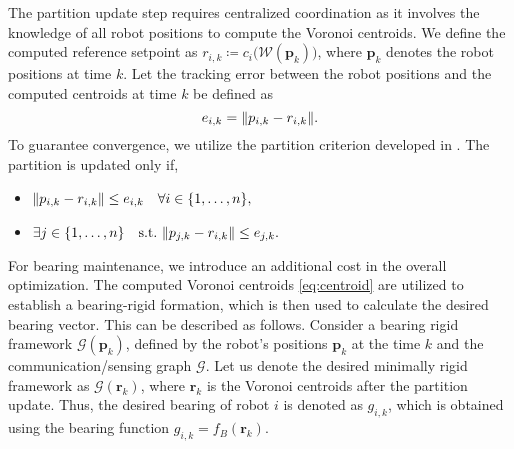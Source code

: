 The partition update step requires centralized coordination as it involves the knowledge of all robot positions to compute the Voronoi centroids. %
We define the computed reference setpoint as $r_{i,k} \coloneq c_i \big( \mathcal{W}(\mathbf{p}_{k}) \big)$, where $\mathbf{p}_k$ denotes the robot positions at time $k$. Let the tracking error between the robot positions and the computed centroids at time $k$ be defined as
\begin{equation}
    e_{i,k} = \lVert p_{i,k} - r_{i,k}\rVert.
\end{equation}
To guarantee convergence, we utilize the partition criterion developed in \cite[Sec. 4]{carron2020model}. The partition is updated only if,
\begin{itemize}
    \item$\lVert p_{i,k} - r_{i,k}\rVert \leq   e_{i,k} \quad \forall i \in \{1,\dots,n\},$  
    \item $\exists j \in \{1,\dots,n\} \quad \text{s.t.} \  \lVert p_{j,k} - r_{i,k}\rVert \leq   e_{j,k}.$
\end{itemize}
For bearing maintenance, we introduce an additional cost in the overall optimization. The computed Voronoi centroids \eqref{eq:centroid} are utilized to establish a bearing-rigid formation, which is then used to calculate the desired bearing vector. This can be described as follows. Consider a bearing rigid framework $\mathcal{G}(\mathbf{p}_k)$, defined by the robot's positions $\mathbf{p}_k$ at the time $k$ and the communication/sensing graph $\mathcal{G}$. Let us denote the desired minimally rigid framework as $\mathcal{G}(\mathbf{r}_{k})$, where $\mathbf{r}_{k}$ is the Voronoi centroids after the partition update. Thus, the desired bearing of robot $i$ is denoted as $g_{i,k}$, which is obtained using the bearing function $g_{i,k} = f_B(\mathbf{r}_{k})$.

